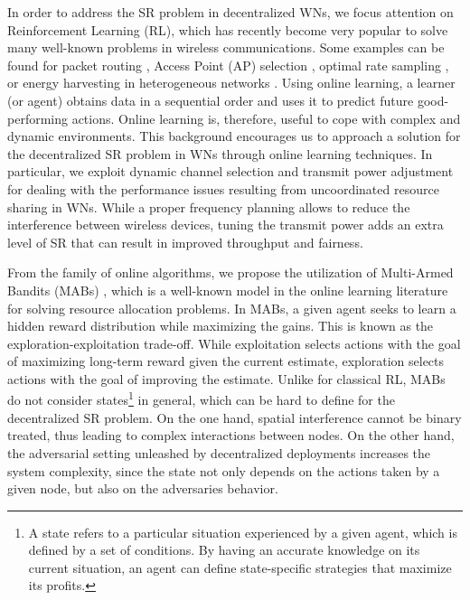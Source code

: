 \documentclass[preprint,12pt]{elsarticle}
\begin{document}
In order to address the SR problem in decentralized WNs, we focus attention on Reinforcement Learning (RL), which has recently become very popular to solve many well-known problems in wireless communications. Some examples can be found for packet routing \cite{littman1993distributed}, Access Point (AP) selection \cite{bojovic2011supervised, bojovic2012neural}, optimal rate sampling \cite{combes2014optimal}, or energy harvesting in heterogeneous networks \cite{miozzo2015distributed}. Using online learning, a learner (or agent) obtains data in a sequential order and uses it to predict future good-performing actions. Online learning is, therefore, useful to cope with complex and dynamic environments. This background encourages us to approach a solution for the decentralized SR problem in WNs through online learning techniques. In particular, we exploit dynamic channel selection and transmit power adjustment for dealing with the performance issues resulting from uncoordinated resource sharing in WNs. While a proper frequency planning allows to reduce the interference between wireless devices, tuning the transmit power adds an extra level of SR that can result in improved throughput and fairness.

From the family of online algorithms, we propose the utilization of Multi-Armed Bandits (MABs) \cite{BCB12}, which is a well-known model in the online learning literature for solving resource allocation problems. In MABs, a given agent seeks to learn a hidden reward distribution while maximizing the gains. This is known as the exploration-exploitation trade-off. %
While exploitation selects actions with the goal of maximizing long-term reward given the current estimate, exploration selects actions with the goal of improving the estimate. Unlike for classical RL, MABs do not consider states\footnote{A state refers to a particular situation experienced by a given agent, which is defined by a set of conditions. By having an accurate knowledge on its current situation, an agent can define state-specific strategies that maximize its profits.} in general, which can be hard to define for the decentralized SR problem. On the one hand, spatial interference cannot be binary treated, thus leading to complex interactions between nodes. On the other hand, the adversarial setting unleashed by decentralized deployments increases the system complexity, since the state not only depends on the actions taken by a given node, but also on the adversaries behavior.
\end{document}
